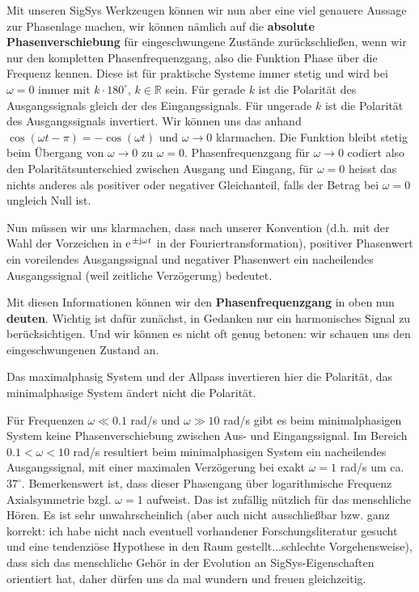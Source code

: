 \begin{Loesung}
Mit unseren SigSys Werkzeugen können wir nun aber eine viel genauere Aussage zur
Phasenlage machen, wir können nämlich auf die \textbf{absolute Phasenverschiebung}
für eingeschwungene Zustände zurückschließen, wenn wir nur den
kompletten Phasenfrequenzgang, also die Funktion Phase über die Frequenz kennen.
Diese ist für praktische Systeme immer stetig und wird bei $\omega=0$ immer mit
$k \cdot 180^\circ$, $k\in\mathbb{R}$ sein. Für gerade $k$ ist die Polarität
des Ausgangssignals gleich der des Eingangssignals. Für ungerade $k$ ist die
Polarität des Ausgangssignals invertiert.
Wir können uns das anhand $\cos(\omega t - \pi) = -\cos(\omega t)$ und $\omega\to 0$
klarmachen. Die Funktion bleibt stetig beim Übergang von $\omega\to 0$ zu $\omega=0$.
Phasenfrequenzgang für $\omega\to 0$ codiert also den Polaritätsunterschied
zwischen Ausgang und Eingang, für $\omega=0$ heisst das nichts anderes als
positiver oder negativer Gleichanteil, falls der Betrag bei $\omega=0$
ungleich Null ist.

Nun müssen wir uns klarmachen, dass nach unserer Konvention (d.h. mit der Wahl der
Vorzeichen in $\e^{\pm \im \omega t}$ in der Fouriertransformation),
positiver Phasenwert ein voreilendes Ausgangssignal und negativer Phasenwert
ein nacheilendes Ausgangssignal (weil zeitliche Verzögerung) bedeutet.

Mit diesen Informationen können wir den \textbf{Phasenfrequenzgang} in
 oben nun \textbf{deuten}. Wichtig ist dafür zunächst,
in Gedanken nur ein harmonisches Signal zu berücksichtigen.
Und wir können es nicht oft genug betonen: wir schauen uns den eingeschwungenen
Zustand an.

Das maximalphasig System und der Allpass invertieren hier die Polarität, das
minimalphasige System ändert nicht die Polarität.

Für Frequenzen $\omega\ll 0.1$ rad/s und $\omega\gg 10$ rad/s gibt es
beim minimalphasigen System keine Phasenverschiebung zwischen Aus- und Eingangssignal.
Im Bereich $0.1 < \omega < 10$ rad/s resultiert beim minimalphasigen System
ein nacheilendes Ausgangssignal,
mit einer maximalen Verzögerung bei exakt $\omega=1$ rad/s um ca. $37^\circ$.
Bemerkenswert ist, dass dieser Phasengang über logarithmische Frequenz Axialsymmetrie
bzgl. $\omega=1$ aufweist. Das ist zufällig nützlich für das menschliche Hören.
Es ist sehr unwahrscheinlich (aber auch nicht ausschließbar bzw.
ganz korrekt: ich habe nicht nach eventuell vorhandener Forschungsliteratur
gesucht und eine tendenziöse Hypothese in den Raum gestellt...schlechte
Vorgehensweise),
dass sich das menschliche Gehör in der Evolution an SigSys-Eigenschaften
orientiert hat, daher dürfen uns da mal wundern und freuen gleichzeitig.


\end{Loesung}
